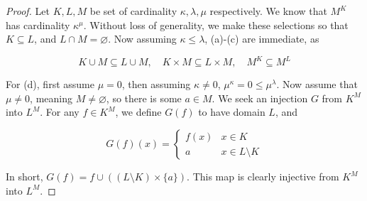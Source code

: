 \begin{proof}
    Let $K,L,M$ be set of cardinality $\kappa, \lambda, \mu$ respectively. We know that $M^K$ has cardinality $\kappa^\mu$. Without loss of generality, we make these selections so that $K \subseteq L$, and $L \cap M = \varnothing$. Now assuming $\kappa \leq \lambda$, (a)-(c) are immediate, as 

    \[K \cup M \subseteq L \cup M, \quad K \times M \subseteq L \times M, \quad M^K \subseteq M^L\]

    For (d), first assume $\mu = 0$, then assuming $\kappa \neq 0$, $\mu^\kappa = 0 \leq \mu^\lambda$. Now assume that $\mu \neq 0$, meaning $M \neq \varnothing$, so there is some $a \in M$. We seek an injection $G$ from $K^M$ into $L^M$. For any $f \in K^M$, we define $G(f)$ to have domain $L$, and 

    \[G(f)(x) = \begin{cases}
        f(x) & x \in K \\ a & x \in L\setminus K
    \end{cases}\]

    In short, $G(f) = f \cup ((L\setminus K) \times \{a\})$. This map is clearly injective from $K^M$ into $L^M$. 
\end{proof}